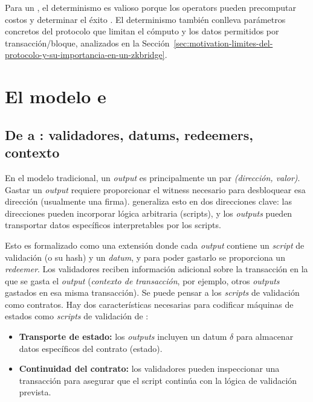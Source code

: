 Para un \zkBridge, el determinismo es valioso porque los \Bridge operators pueden precomputar costos y determinar el éxito \Offchain. El determinismo también conlleva parámetros concretos del protocolo que limitan el cómputo y los datos permitidos por transacción/bloque, analizados en la Sección~\ref{sec:motivation-limites-del-protocolo-y-su-importancia-en-un-zkbridge}.

\section{El modelo e\UTxO}
\label{sec:motivation-el-modelo-e-utxo}

\subsection{De \UTxO a \eUTxO: validadores, datums, redeemers, contexto}
\label{subsec:motivation-de-utxo-a-eutxo-validadores-datums-redeemers-contexto}

En el modelo \UTxO tradicional, un \textit{output} es principalmente un par \emph{(dirección, valor)}. Gastar un \textit{output} requiere proporcionar el witness necesario para desbloquear esa dirección (usualmente una firma). \Cardano generaliza esto en dos direcciones clave: las direcciones pueden incorporar lógica arbitraria (scripts), y los \textit{outputs} pueden transportar datos específicos interpretables por los scripts.

Esto es formalizado \cite{Chakravarty2020} como una extensión donde cada \textit{output} contiene un \textit{script} de validación (o su hash) y un \textit{datum}, y para poder gastarlo se proporciona un \textit{redeemer}. Los validadores reciben información adicional sobre la transacción en la que se gasta el \textit{output} (\emph{contexto de transacción}, por ejemplo, otros \textit{outputs} gastados en esa misma transacción). Se puede pensar a los \textit{scripts} de validación como contratos. Hay dos características necesarias para codificar máquinas de estados como \textit{scripts} de validación de \Cardano:

\begin{itemize}[noitemsep]
	\item \textbf{Transporte de estado:} los \textit{outputs} incluyen un datum $\delta$ para almacenar datos específicos del contrato (estado).
	\item \textbf{Continuidad del contrato:} los validadores pueden inspeccionar una transacción para asegurar que el script continúa con la lógica de validación prevista.
\end{itemize}

